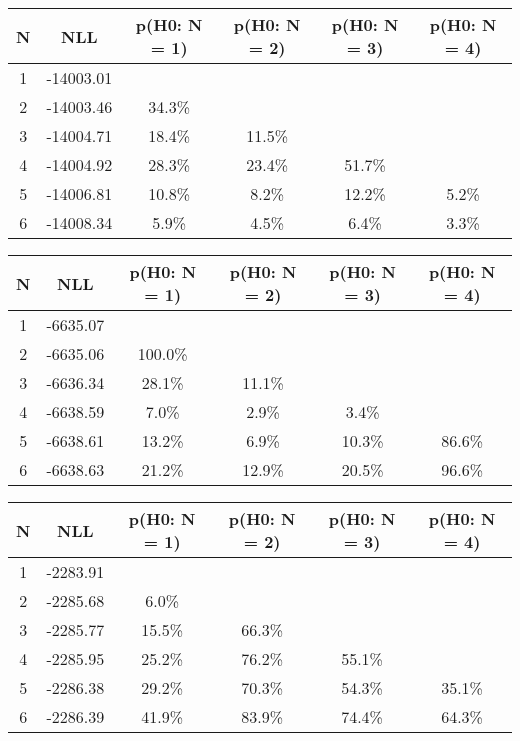 \begin{table}[htb]
	\begin{center}
{\footnotesize\renewcommand{\arraystretch}{1.4}
		\begin{tabular}{cc||cccc}
			N & NLL & p(H0: N = 1) & p(H0: N = 2) & p(H0: N = 3) & p(H0: N = 4)\\ 
		\hline
1 & -14003.01 & & & & \\
2 & -14003.46 & 34.3\% & & & \\
3 & -14004.71 & 18.4\% & 11.5\% & & \\
4 & -14004.92 & 28.3\% & 23.4\% & 51.7\% & \\
5 & -14006.81 & 10.8\% & 8.2\% & 12.2\% & 5.2\% \\
6 & -14008.34 & 5.9\% & 4.5\% & 6.4\% & 3.3\% \\
	\end{tabular}
		\label{tab:lab}
	}
	\end{center}\end{table}

\begin{table}[htb]
	\begin{center}
{\footnotesize\renewcommand{\arraystretch}{1.4}
		\begin{tabular}{cc||cccc}
			N & NLL & p(H0: N = 1) & p(H0: N = 2) & p(H0: N = 3) & p(H0: N = 4)\\ 
		\hline
1 & -6635.07 & & & & \\
2 & -6635.06 & 100.0\% & & & \\
3 & -6636.34 & 28.1\% & 11.1\% & & \\
4 & -6638.59 & 7.0\% & 2.9\% & 3.4\% & \\
5 & -6638.61 & 13.2\% & 6.9\% & 10.3\% & 86.6\% \\
6 & -6638.63 & 21.2\% & 12.9\% & 20.5\% & 96.6\% \\
	\end{tabular}
		\label{tab:lab}
	}
	\end{center}\end{table}

\begin{table}[htb]
	\begin{center}
{\footnotesize\renewcommand{\arraystretch}{1.4}
		\begin{tabular}{cc||cccc}
			N & NLL & p(H0: N = 1) & p(H0: N = 2) & p(H0: N = 3) & p(H0: N = 4)\\ 
		\hline
1 & -2283.91 & & & & \\
2 & -2285.68 & 6.0\% & & & \\
3 & -2285.77 & 15.5\% & 66.3\% & & \\
4 & -2285.95 & 25.2\% & 76.2\% & 55.1\% & \\
5 & -2286.38 & 29.2\% & 70.3\% & 54.3\% & 35.1\% \\
6 & -2286.39 & 41.9\% & 83.9\% & 74.4\% & 64.3\% \\
	\end{tabular}
		\label{tab:lab}
	}
	\end{center}\end{table}

